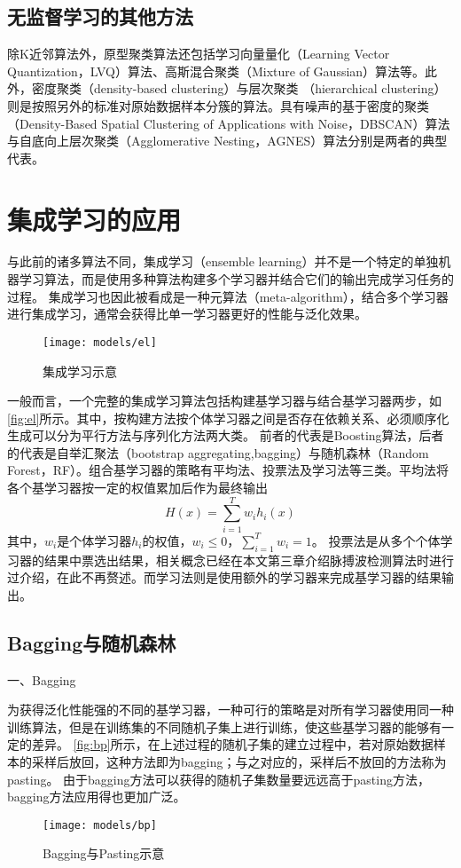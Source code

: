\subsection{无监督学习的其他方法}
除K近邻算法外，原型聚类算法还包括学习向量量化（Learning Vector Quantization，LVQ）算法、高斯混合聚类（Mixture of Gaussian）算法等。此外，密度聚类（density-based clustering）与层次聚类
（hierarchical clustering）则是按照另外的标准对原始数据样本分簇的算法。具有噪声的基于密度的聚类（Density-Based Spatial Clustering of Applications with Noise，DBSCAN）算法
与自底向上层次聚类（Agglomerative Nesting，AGNES）算法分别是两者的典型代表\cite{Zhou2016}。

\section{集成学习的应用}
与此前的诸多算法不同，集成学习（ensemble learning）并不是一个特定的单独机器学习算法，而是使用多种算法构建多个学习器并结合它们的输出完成学习任务的过程\cite{Zhou2016,Aurélien2018}。
集成学习也因此被看成是一种元算法（meta-algorithm），结合多个学习器进行集成学习，通常会获得比单一学习器更好的性能与泛化效果。
\begin{figure}[htbp]
    \centering
    \texttt{[image: models/el]}
    \caption[集成学习示意]{\label{fig:el}集成学习示意}
\end{figure}

一般而言，一个完整的集成学习算法包括构建基学习器与结合基学习器两步，如\autoref{fig:el}所示。其中，按构建方法按个体学习器之间是否存在依赖关系、必须顺序化生成可以分为平行方法与序列化方法两大类\cite{Zhou2016}。
前者的代表是Boosting算法，后者的代表是自举汇聚法（bootstrap aggregating,bagging）与随机森林（Random Forest，RF）。组合基学习器的策略有平均法、投票法及学习法等三类。平均法将各个基学习器按一定的权值累加后作为最终输出
\begin{equation}
    \label{equ:average}
    H(x)=\sum_{i=1}^{T}{w_ih_i(x)}
\end{equation}
其中，$w_i$是个体学习器$h_i$的权值，$w_i\le 0$，$\sum_{i=1}^T{w_i}=1$。
投票法是从多个个体学习器的结果中票选出结果，相关概念已经在本文第三章介绍脉搏波检测算法时进行过介绍，在此不再赘述。而学习法则是使用额外的学习器来完成基学习器的结果输出。

\subsection{Bagging与随机森林}
一、Bagging

为获得泛化性能强的不同的基学习器，一种可行的策略是对所有学习器使用同一种训练算法，但是在训练集的不同随机子集上进行训练，使这些基学习器的能够有一定的差异。
\autoref{fig:bp}所示，在上述过程的随机子集的建立过程中，若对原始数据样本的采样后放回，这种方法即为bagging；与之对应的，采样后不放回的方法称为pasting\cite{Aurélien2018,Zhou2016}。
由于bagging方法可以获得的随机子集数量要远远高于pasting方法，bagging方法应用得也更加广泛。
\begin{figure}[htbp]
    \centering
    \texttt{[image: models/bp]}
    \caption[Bagging与Pasting示意]{\label{fig:bp}Bagging与Pasting示意\cite{Aurélien2018}}
\end{figure}


